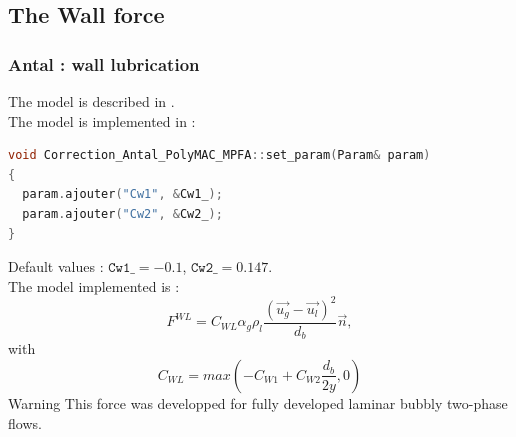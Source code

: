 \subsection{The Wall force}

%
\subsubsection{Antal : wall lubrication}
The model is described in \cite{ANTAL1991635}.\\
The model is implemented in :
\begin{lstlisting}[language=c++]
void Correction_Antal_PolyMAC_MPFA::set_param(Param& param)
{
  param.ajouter("Cw1", &Cw1_);
  param.ajouter("Cw2", &Cw2_);
}
\end{lstlisting}
Default values :  $\texttt{Cw1\_} =  -0.1$, $\texttt{Cw2\_} =  0.147$.\\
The model implemented is :
\begin{equation}
   F^{WL}=C_{WL}\alpha_g\rho_l\frac{(\vec{u_g}-\vec{u_l})^2}{d_b}\vec{n},
\end{equation}
with
\begin{equation}
   C_{WL}=max(-C_{W1}+C_{W2}\frac{d_b}{2y},0)
\end{equation}
{\color{red} Warning} This force was developped for fully developed laminar bubbly two-phase flows.

